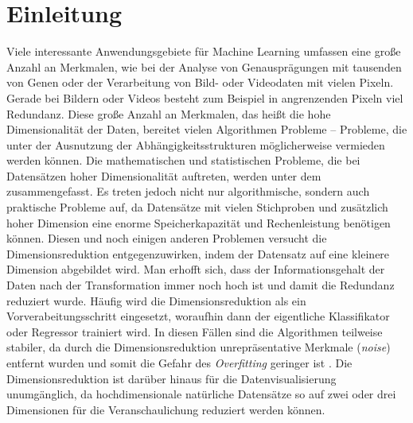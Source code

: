 \chapter{Einleitung}
\label{ch:Enleitung}

Viele interessante Anwendungsgebiete für Machine Learning umfassen eine große Anzahl an Merkmalen,
wie bei der Analyse von Genausprägungen mit tausenden von Genen \parencite{Parmigiani.2003} oder der Verarbeitung von Bild- oder Videodaten mit vielen Pixeln. Gerade
bei Bildern oder Videos besteht zum Beispiel in angrenzenden Pixeln viel Redundanz. Diese große
Anzahl an Merkmalen, das heißt die hohe Dimensionalität der Daten, bereitet vielen Algorithmen
Probleme -- Probleme, die unter der Ausnutzung der Abhängigkeitsstrukturen möglicherweise vermieden
werden können. Die mathematischen und statistischen Probleme, die bei Datensätzen hoher
Dimensionalität auftreten, werden unter dem  \parencite{Aggarwal.2001} zusammengefasst. Es treten jedoch nicht nur algorithmische, sondern auch
praktische Probleme auf, da Datensätze mit vielen Stichproben und zusätzlich hoher Dimension eine
enorme Speicherkapazität und Rechenleistung benötigen können.
Diesen und noch einigen anderen Problemen versucht die Dimensionsreduktion entgegenzuwirken, indem
der Datensatz auf eine kleinere Dimension abgebildet wird. Man erhofft sich, dass der
Informationsgehalt der Daten nach der Transformation immer noch hoch ist und damit die Redundanz
reduziert wurde. Häufig wird die Dimensionsreduktion als ein Vorverabeitungsschritt eingesetzt,
woraufhin dann der eigentliche Klassifikator oder Regressor trainiert wird. In diesen Fällen sind
die Algorithmen teilweise stabiler, da durch die Dimensionsreduktion unrepräsentative Merkmale
(\textit{noise}) entfernt wurden und somit die Gefahr des \textit{Overfitting} geringer ist \parencites[siehe]{Plastria.2008}{MustafaAbdulSalam.2021}. Die Dimensionsreduktion ist darüber hinaus
für die Datenvisualisierung unumgänglich, da hochdimensionale natürliche Datensätze so auf zwei
oder drei Dimensionen für die Veranschaulichung reduziert werden können.

